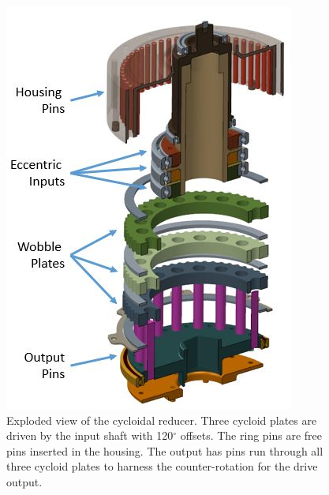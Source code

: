 \begin{figure}[!b]
   \centering
   \includegraphics[width=0.5\linewidth]{fig/exploded_labeled}
   \caption{Exploded view of the cycloidal reducer.
   Three cycloid plates are driven by the input shaft with 120$^\circ$ offsets.
   The ring pins are free pins inserted in the housing.
   The output has pins run through all three cycloid plates to harness the counter-rotation for the drive output.}
   \label{fig:single_stage}
\end{figure}

